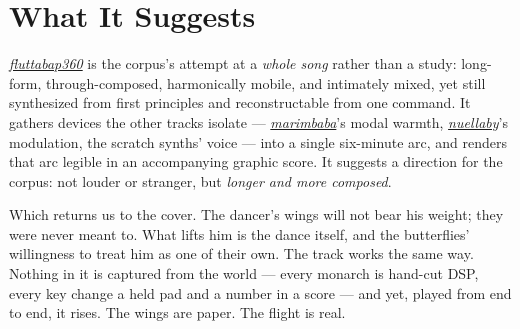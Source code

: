 \documentclass[11pt,letterpaper]{article}
\newcommand{\trk}[2]{\href{https://assets.aesthetic.computer/pop/#1.mp3}{\textit{#2}}}
\newcommand{\fl}{\trk{fluttabap360}{fluttabap360}}
\begin{document}
\section{What It Suggests}

\fl{} is the corpus's attempt at a \textit{whole song} rather than a study: long-form, through-composed, harmonically mobile, and intimately mixed, yet still synthesized from first principles and reconstructable from one command. It gathers devices the other tracks isolate --- \trk{marimbaba}{marimbaba}'s modal warmth, \trk{nuellaby}{nuellaby}'s modulation, the scratch synths' voice --- into a single six-minute arc, and renders that arc legible in an accompanying graphic score. It suggests a direction for the corpus: not louder or stranger, but \textit{longer and more composed}.

Which returns us to the cover. The dancer's wings will not bear his weight; they were never meant to. What lifts him is the dance itself, and the butterflies' willingness to treat him as one of their own. The track works the same way. Nothing in it is captured from the world --- every monarch is hand-cut DSP, every key change a held pad and a number in a score --- and yet, played from end to end, it rises. The wings are paper. The flight is real.

\end{document}
